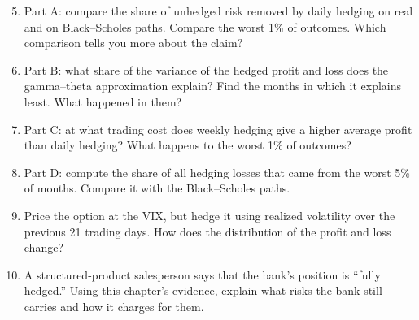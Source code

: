 \begin{enumerate}
  \setcounter{enumi}{4}
  \item Part A: compare the share of unhedged risk removed by daily hedging on real and on Black--Scholes paths. Compare the worst 1\% of outcomes. Which comparison tells you more about the claim?
  \item Part B: what share of the variance of the hedged profit and loss does the gamma--theta approximation explain? Find the months in which it explains least. What happened in them?
  \item Part C: at what trading cost does weekly hedging give a higher average profit than daily hedging? What happens to the worst 1\% of outcomes?
  \item Part D: compute the share of all hedging losses that came from the worst 5\% of months. Compare it with the Black--Scholes paths.
  \item Price the option at the VIX, but hedge it using realized volatility over the previous 21 trading days. How does the distribution of the profit and loss change?
  \item A structured-product salesperson says that the bank's position is ``fully hedged.'' Using this chapter's evidence, explain what risks the bank still carries and how it charges for them.
\end{enumerate}
